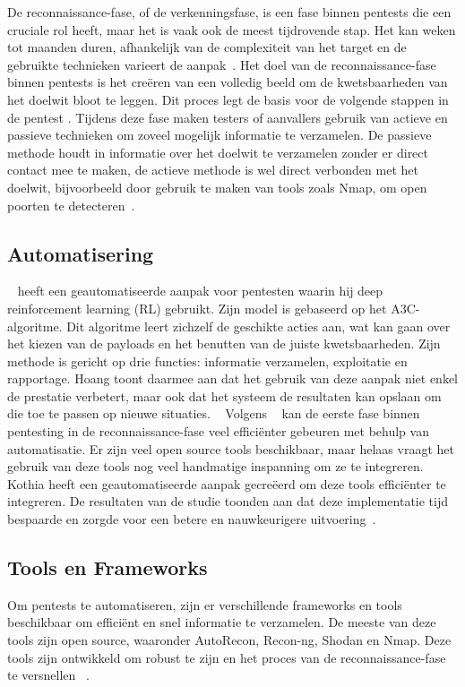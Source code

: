 De reconnaissance-fase, of de verkenningsfase, is een fase binnen pentests die een cruciale rol heeft, maar het is vaak ook de meest tijdrovende stap.
Het kan weken tot maanden duren, afhankelijk van de complexiteit van het target en de gebruikte technieken varieert de aanpak~\autocite{Shah}. 
Het doel van de reconnaissance-fase binnen pentests is het creëren van een volledig beeld om de 
kwetsbaarheden van het doelwit bloot te leggen. Dit proces legt de basis voor de
volgende stappen in de pentest \autocite{Kothia}. 
Tijdens deze fase maken testers of aanvallers gebruik van actieve en passieve technieken om zoveel
mogelijk informatie te verzamelen. De passieve methode houdt in informatie over het doelwit te verzamelen zonder er direct contact mee te maken, 
de actieve methode is wel direct verbonden met het doelwit, bijvoorbeeld door gebruik te maken van tools zoals Nmap, om open poorten te detecteren~\autocite{Shah}.

\subsection{Automatisering}

~\textcite{Hoang} heeft een geautomatiseerde aanpak voor pentesten waarin hij deep reinforcement 
learning (RL) gebruikt. Zijn model is gebaseerd op het A3C-algoritme. Dit algoritme leert zichzelf de geschikte acties aan, wat kan 
gaan over het kiezen van de payloads en het benutten van de juiste kwetsbaarheden. Zijn methode is gericht op drie functies: informatie verzamelen, 
exploitatie en rapportage. Hoang toont daarmee aan dat het gebruik van deze aanpak niet enkel de prestatie verbetert, maar ook dat het systeem de resultaten 
kan opslaan om die toe te passen op nieuwe situaties. ~\autocite{Hoang}
Volgens ~\textcite{Kothia} kan de eerste fase binnen pentesting in de reconnaissance-fase veel 
efficiënter gebeuren met behulp van automatisatie. Er zijn veel open source tools beschikbaar, maar helaas vraagt het gebruik van deze 
tools nog veel handmatige inspanning om ze te integreren. Kothia heeft een geautomatiseerde aanpak gecreëerd om deze tools
efficiënter te integreren. De resultaten van de studie toonden aan dat deze implementatie tijd 
bespaarde en zorgde voor een betere en nauwkeurigere uitvoering~\autocite{Kothia}.


\subsection{Tools en Frameworks}
Om pentests te automatiseren, zijn er verschillende frameworks en tools beschikbaar om 
efficiënt en snel informatie te verzamelen. De meeste van deze tools zijn open source, waaronder 
AutoRecon, Recon-ng, Shodan en Nmap. Deze tools zijn ontwikkeld om robust te zijn en het proces van de reconnaissance-fase te versnellen ~\autocite{Shebli}.


